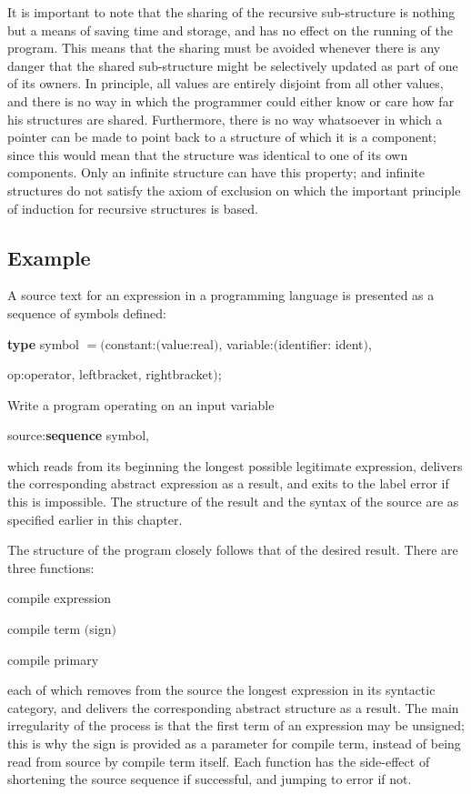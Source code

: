 \documentclass[twoside,11pt]{book}
\begin{document}
It is important to note that the sharing of the recursive sub-structure is nothing but a means of saving time and storage, and has no effect on the running of the program. This means that the sharing must be avoided whenever there is any danger that the shared sub-structure might be selectively updated as part of one of its owners. In principle, all values are entirely disjoint from all other values, and there is no way in which the programmer could either know or care how far his structures are shared. Furthermore, there is no way whatsoever in which a pointer can be made to point back to a structure of which it is a component; since this would mean that the structure was identical to one of its own components. Only an infinite structure can have this property; and infinite structures do not satisfy the axiom of exclusion on which the important principle of induction for recursive structures is based.

\subsection{Example}
\label{sec:example-9-2}

A source text for an expression in a programming language is presented as a sequence of symbols defined:

\quad \textbf{type} symbol $= ($constant:$($value:real$)$, variable:$($identifier: ident$)$,

\tabto*{9.2em}op:operator, leftbracket, rightbracket$)$;

Write a program operating on an input variable

\quad source:\textbf{sequence} symbol,

\noindent
which reads from its beginning the longest possible legitimate expression, delivers the corresponding abstract expression as a result, and exits to the label error if this is impossible. The structure of the result and the syntax of the source are as specified earlier in this chapter.

The structure of the program closely follows that of the desired result. There are three functions:

\quad compile expression

\quad compile term $($sign$)$

\quad compile primary

\noindent
each of which removes from the source the longest expression in its syntactic category, and delivers the corresponding abstract structure as a result. The main irregularity of the process is that the first term of an expression may be unsigned; this is why the sign is provided as a parameter for compile term, instead of being read from source by compile term itself. Each function has the side-effect of shortening the source sequence if successful, and jumping to error if not.
\end{document}
